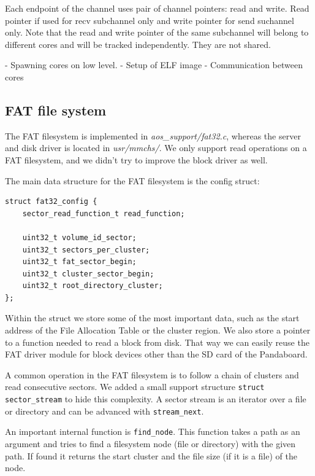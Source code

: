 \documentclass[a4paper,10pt]{article}
\newcommand{\filepath}[1]{\emph{ #1}}
\begin{document}
	Each endpoint of the channel uses pair of channel pointers: read and write. 
	Read pointer if used for recv subchannel only and write pointer for send suchannel only.
	Note that the read and write pointer of the same subchannel will belong to different cores and will be tracked independently.
	They are not shared. 
	
\todo {}

- Spawning cores on low level.
- Setup of ELF image
- Communication between cores

\subsection{FAT file system}

The FAT filesystem is implemented in \filepath{aos\_support/fat32.c}, whereas the server and disk driver is located in \filepath{usr/mmchs/}.
We only support read operations on a FAT filesystem, and we didn't try to improve the block driver as well.

The main data structure for the FAT filesystem is the config struct:

\begin{lstlisting}
struct fat32_config {
    sector_read_function_t read_function;

    uint32_t volume_id_sector;
    uint32_t sectors_per_cluster;
    uint32_t fat_sector_begin;
    uint32_t cluster_sector_begin;
    uint32_t root_directory_cluster;
};
\end{lstlisting}

Within the struct we store some of the most important data, such as the start address of the File Allocation Table or the cluster region.
We also store a pointer to a function needed to read a block from disk.
That way we can easily reuse the FAT driver module for block devices other than the SD card of the Pandaboard.

A common operation in the FAT filesystem is to follow a chain of clusters and read consecutive sectors.
We added a small support structure \lstinline!struct sector_stream! to hide this complexity.
A sector stream is an iterator over a file or directory and can be advanced with \lstinline!stream_next!.

An important internal function is \lstinline!find_node!.
This function takes a path as an argument and tries to find a filesystem node (file or directory) with the given path.
If found it returns the start cluster and the file size (if it is a file) of the node.
\end{document}
